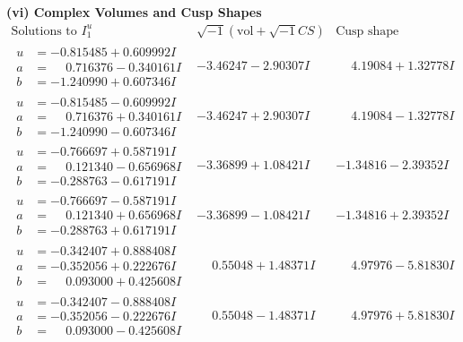 \documentclass[1p]{elsarticle_modified}
\theoremstyle{definition}
\newcommand{\I}{\sqrt{-1}}
\begin{document}
\newpage\flushleft \textbf{(vi) Complex Volumes and Cusp Shapes}
$$\begin{array}{c|c|c}  
\text{Solutions to }I^u_{1}& \I (\text{vol} + \sqrt{-1}CS) & \text{Cusp shape}\\
 \hline 
\begin{aligned}
u &= -0.815485 + 0.609992 I \\
a &= \phantom{-}0.716376 - 0.340161 I \\
b &= -1.240990 + 0.607346 I\end{aligned}
 & -3.46247 - 2.90307 I & \phantom{-}4.19084 + 1.32778 I \\ \hline\begin{aligned}
u &= -0.815485 - 0.609992 I \\
a &= \phantom{-}0.716376 + 0.340161 I \\
b &= -1.240990 - 0.607346 I\end{aligned}
 & -3.46247 + 2.90307 I & \phantom{-}4.19084 - 1.32778 I \\ \hline\begin{aligned}
u &= -0.766697 + 0.587191 I \\
a &= \phantom{-}0.121340 - 0.656968 I \\
b &= -0.288763 - 0.617191 I\end{aligned}
 & -3.36899 + 1.08421 I & -1.34816 - 2.39352 I \\ \hline\begin{aligned}
u &= -0.766697 - 0.587191 I \\
a &= \phantom{-}0.121340 + 0.656968 I \\
b &= -0.288763 + 0.617191 I\end{aligned}
 & -3.36899 - 1.08421 I & -1.34816 + 2.39352 I \\ \hline\begin{aligned}
u &= -0.342407 + 0.888408 I \\
a &= -0.352056 + 0.222676 I \\
b &= \phantom{-}0.093000 + 0.425608 I\end{aligned}
 & \phantom{-}0.55048 + 1.48371 I & \phantom{-}4.97976 - 5.81830 I \\ \hline\begin{aligned}
u &= -0.342407 - 0.888408 I \\
a &= -0.352056 - 0.222676 I \\
b &= \phantom{-}0.093000 - 0.425608 I\end{aligned}
 & \phantom{-}0.55048 - 1.48371 I & \phantom{-}4.97976 + 5.81830 I \\ \hline\begin{aligned}

\end{aligned}
\end{array}$$
\end{document}
